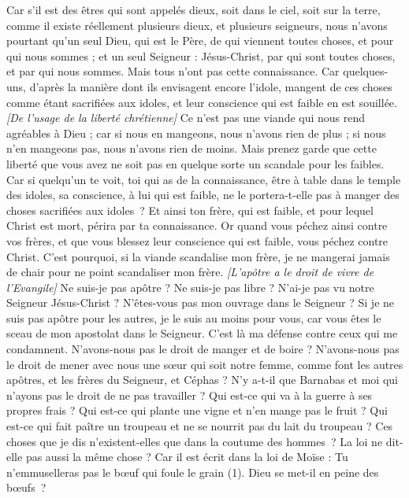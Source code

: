\begin{multicols}{2}
Car s’il est des êtres qui sont appelés dieux, soit dans le ciel, soit sur la terre, comme il existe réellement plusieurs dieux, et plusieurs seigneurs,
nous n’avons pourtant qu'un seul Dieu, qui est le Père, de qui viennent toutes choses, et pour qui nous sommes ; et un seul Seigneur : Jésus-Christ, par qui sont toutes choses, et par qui nous sommes.
Mais tous n’ont pas cette connaissance. Car quelques-uns, d’après la manière dont ils envisagent encore l'idole, mangent de ces choses comme étant sacrifiées aux idoles, et leur conscience qui est faible en est souillée.
\textit{[De l'usage de la liberté chrétienne]}
Ce n’est pas une viande qui nous rend agréables à Dieu ; car si nous en mangeons, nous n'avons rien de plus ; si nous n’en mangeons pas, nous n’avons rien de moins.
Mais prenez garde que cette liberté que vous avez ne soit pas en quelque sorte un scandale pour les faibles.
Car si quelqu'un te voit, toi qui as de la connaissance, être à table dans le temple des idoles, sa conscience, à lui qui est faible, ne le portera-t-elle pas à manger des choses sacrifiées aux idoles ?
Et ainsi ton frère, qui est faible, et pour lequel Christ est mort, périra par ta connaissance.
Or quand vous péchez ainsi contre vos frères, et que vous blessez leur conscience qui est faible, vous péchez contre Christ.
C'est pourquoi, si la viande scandalise mon frère, je ne mangerai jamais de chair pour ne point scandaliser mon frère.
\textit{[L'apôtre a le droit de vivre de l'Evangile]}
\VerseOne{}Ne suis-je pas apôtre ? Ne suis-je pas libre ? N’ai-je pas vu notre Seigneur Jésus-Christ ? N’êtes-vous pas mon ouvrage dans le Seigneur ?
Si je ne suis pas apôtre pour les autres, je le suis au moins pour vous, car vous êtes le sceau de mon apostolat dans le Seigneur.
C'est là ma défense contre ceux qui me condamnent.
N'avons-nous pas le droit de manger et de boire ?
N'avons-nous pas le droit de mener avec nous une sœur qui soit notre femme, comme font les autres apôtres, et les frères du Seigneur, et Céphas ?
N'y a-t-il que Barnabas et moi qui n'ayons pas le droit de ne pas travailler ?
Qui est-ce qui va à la guerre à ses propres frais ? Qui est-ce qui plante une vigne et n’en mange pas le fruit ? Qui est-ce qui fait paître un troupeau et ne se nourrit pas du lait du troupeau ?
Ces choses que je dis n’existent-elles que dans la coutume des hommes ? La loi ne dit-elle pas aussi la même chose ?
Car il est écrit dans la loi de Moïse : Tu n'emmuselleras pas le bœuf qui foule le grain (1). Dieu se met-il en peine des bœufs ?

\end{multicols}
